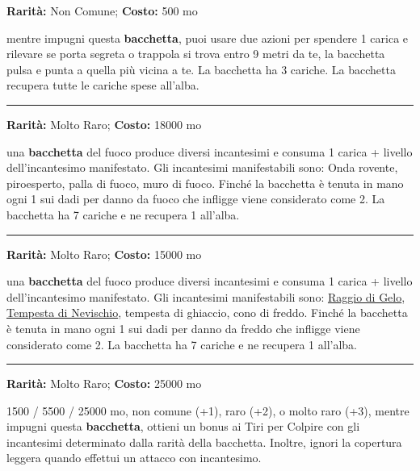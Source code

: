 \begin{multicols}{2}
\textbf{Rarità:} Non Comune; \textbf{Costo:} 500 mo

mentre impugni questa \textbf{bacchetta}, puoi usare due azioni per spendere 1 carica e rilevare se porta segreta o trappola si trova entro 9 metri da te, la bacchetta pulsa e punta a quella più vicina a te. La bacchetta ha 3 cariche. La bacchetta recupera tutte le cariche spese all'alba.

\smallskip\noindent\rule{\linewidth}{2pt}  \hypertarget{BacchettadelFuoco}{}\medskip{}\noindent\label{BacchettadelFuoco}

\textbf{Rarità:} Molto Raro; \textbf{Costo:} 18000 mo

una \textbf{bacchetta} del fuoco produce diversi incantesimi e consuma 1 carica + livello dell'incantesimo manifestato. Gli incantesimi manifestabili sono: Onda rovente, piroesperto, palla di fuoco, muro di fuoco. Finché la bacchetta è tenuta in mano ogni 1 sui dadi per danno da fuoco che infligge viene considerato come 2. La bacchetta ha 7 cariche e ne recupera 1 all'alba.

\smallskip\noindent\rule{\linewidth}{2pt}  \hypertarget{BacchettadelGhiaccio}{}\medskip{}\noindent\label{BacchettadelGhiaccio}

\textbf{Rarità:} Molto Raro; \textbf{Costo:} 15000 mo

una \textbf{bacchetta} del fuoco produce diversi incantesimi e consuma 1 carica + livello dell'incantesimo manifestato. Gli incantesimi manifestabili sono: \hyperlink{Raggio di Gelo}{Raggio di Gelo}, \hyperlink{Tempesta di Nevischio}{Tempesta di Nevischio}, tempesta di ghiaccio, cono di freddo. Finché la bacchetta è tenuta in mano ogni 1 sui dadi per danno da freddo che infligge viene considerato come 2. La bacchetta ha 7 cariche e ne recupera 1 all'alba.

\smallskip\noindent\rule{\linewidth}{2pt}  \hypertarget{BacchettadelMagodaGuerra}{}\medskip{}\noindent\label{BacchettadelMagodaGuerra}

\textbf{Rarità:} Molto Raro; \textbf{Costo:} 25000 mo

1500 / 5500 / 25000 mo, non comune (+1), raro (+2), o molto raro (+3), mentre impugni questa \textbf{bacchetta}, ottieni un bonus ai Tiri per Colpire con gli incantesimi determinato dalla rarità della bacchetta. Inoltre, ignori la copertura leggera quando effettui un attacco con incantesimo.


\end{multicols}
